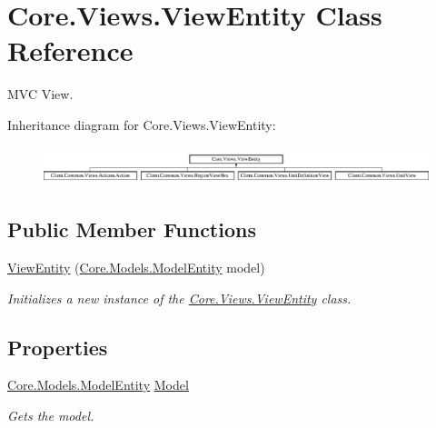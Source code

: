\hypertarget{classCore_1_1Views_1_1ViewEntity}{}\section{Core.\+Views.\+View\+Entity Class Reference}
\label{classCore_1_1Views_1_1ViewEntity}


M\+V\+C View.  


Inheritance diagram for Core.\+Views.\+View\+Entity\+:\begin{figure}[H]
\begin{center}
\leavevmode
\includegraphics[height=1.129032cm]{classCore_1_1Views_1_1ViewEntity}
\end{center}
\end{figure}
\subsection*{Public Member Functions}
\begin{DoxyCompactItemize}
\item 
\hyperlink{classCore_1_1Views_1_1ViewEntity_acdc36500f751130de54bd6a7a1510090}{View\+Entity} (\hyperlink{classCore_1_1Models_1_1ModelEntity}{Core.\+Models.\+Model\+Entity} model)
\begin{DoxyCompactList}\small\item\em Initializes a new instance of the \hyperlink{classCore_1_1Views_1_1ViewEntity}{Core.\+Views.\+View\+Entity} class. \end{DoxyCompactList}\end{DoxyCompactItemize}
\subsection*{Properties}
\begin{DoxyCompactItemize}
\item 
\hyperlink{classCore_1_1Models_1_1ModelEntity}{Core.\+Models.\+Model\+Entity} \hyperlink{classCore_1_1Views_1_1ViewEntity_a02f7bdb82b8be688423db82f9cbde4a3}{Model}
\begin{DoxyCompactList}\small\item\em Gets the model. \end{DoxyCompactList}\end{DoxyCompactItemize}


